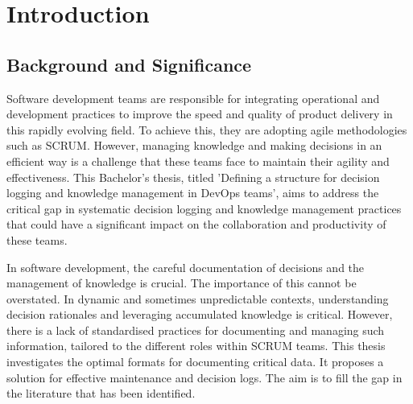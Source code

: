 



\chapter{Introduction} %
\label{Chapter1} %


\newcommand{\keyword}[1]{\textbf{#1}}
\newcommand{\tabhead}[1]{\textbf{#1}}
\newcommand{\code}[1]{\texttt{#1}}
\newcommand{\file}[1]{\texttt{\bfseries#1}}
\newcommand{\option}[1]{\texttt{\itshape#1}}





\section{Background and Significance}

Software development teams are responsible for integrating operational and development practices to improve the speed and quality of product delivery in this rapidly evolving field. To achieve this, they are adopting agile methodologies such as SCRUM. However, managing knowledge and making decisions in an efficient way is a challenge that these teams face to maintain their agility and effectiveness. This Bachelor's thesis, titled 'Defining a structure for decision logging and knowledge management in DevOps teams', aims to address the critical gap in systematic decision logging and knowledge management practices that could have a significant impact on the collaboration and productivity of these teams.

In software development, the careful documentation of decisions and the management of knowledge is crucial. The importance of this cannot be overstated. In dynamic and sometimes unpredictable contexts, understanding decision rationales and leveraging accumulated knowledge is critical. However, there is a lack of standardised practices for documenting and managing such information, tailored to the different roles within SCRUM teams. This thesis investigates the optimal formats for documenting critical data. It proposes a solution for effective maintenance and decision logs. The aim is to fill the gap in the literature that has been identified.

